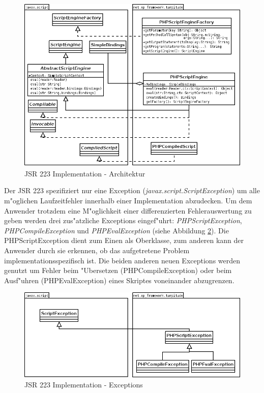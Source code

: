 \begin{figure}[h]
\includegraphics[width=\textwidth]{chap1/img/turpitude.png}
\caption{JSR 223 Implementation - Architektur}
\label{fig:jsr223impl}
\end{figure}

Der JSR 223 spezifiziert nur eine Exception (\emph{javax.script.ScriptException}) um alle m"oglichen Laufzeitfehler innerhalb einer 
Implementation abzudecken. Um dem Anwender trotzdem eine M"oglichkeit einer differenzierten Fehlerauswertung zu geben werden drei
zus"atzliche Exceptions eingef"uhrt: \emph{PHPScriptException}, \emph{PHPCompileException} und \emph{PHPEvalException} (siehe Abbildung
\ref{fig:jsr223exceptions}). Die PHPScriptException dient zum Einen als Oberklasse, zum anderen kann der Anwender durch sie erkennen, ob
das aufgetretene Problem implementationsspezifisch ist. Die beiden anderen neuen Exceptions werden genutzt um Fehler beim "Ubersetzen 
(PHPCompileException) oder beim Ausf"uhren (PHPEvalException) eines Skriptes voneinander abzugrenzen.

\begin{figure}[h]
\includegraphics[width=\textwidth]{chap1/img/exceptions.png}
\caption{JSR 223 Implementation - Exceptions}
\label{fig:jsr223exceptions}
\end{figure}

